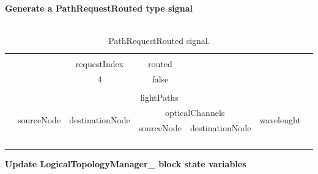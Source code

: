 \textbf{Generate a PathRequestRouted type signal}\\ \\

\begin{table}[H]
	\centering
	\begin{tabular}{|lllclll|}
		\hline
		&  &  & \multicolumn{1}{l}{} &  &  &  \\ \cline{3-4}
		& \multicolumn{1}{l|}{} & \multicolumn{1}{c|}{requestIndex} & \multicolumn{1}{c|}{routed} &  &  &  \\ \cline{3-4}
		& \multicolumn{1}{l|}{} & \multicolumn{1}{c|}{4} & \multicolumn{1}{c|}{false} &  &  &  \\ \cline{3-4}
		&  &  & \multicolumn{1}{l}{} &  &  &  \\ \cline{2-6}
		\multicolumn{1}{|l|}{} & \multicolumn{5}{c|}{lightPaths} &  \\ \cline{2-6}
		\multicolumn{1}{|l|}{} & \multicolumn{1}{l|}{\multirow{2}{*}{sourceNode}} & \multicolumn{1}{l|}{\multirow{2}{*}{destinationNode}} & \multicolumn{2}{c|}{opticalChannels} & \multicolumn{1}{l|}{\multirow{2}{*}{wavelenght}} &  \\ \cline{4-5}
		\multicolumn{1}{|l|}{} & \multicolumn{1}{l|}{} & \multicolumn{1}{l|}{} & \multicolumn{1}{l|}{sourceNode} & \multicolumn{1}{l|}{destinationNode} & \multicolumn{1}{l|}{} &  \\ \cline{2-6}
		\multicolumn{1}{|l|}{} & \multicolumn{1}{c|}{\multirow{3}{*}{}} & \multicolumn{1}{c|}{\multirow{3}{*}{}} & \multicolumn{1}{c|}{} & \multicolumn{1}{c|}{} & \multicolumn{1}{c|}{\multirow{3}{*}{}} &  \\ \cline{4-5}
		\multicolumn{1}{|l|}{} & \multicolumn{1}{c|}{} & \multicolumn{1}{c|}{} & \multicolumn{1}{c|}{} & \multicolumn{1}{c|}{} & \multicolumn{1}{c|}{} &  \\ \cline{4-5}
		\multicolumn{1}{|l|}{} & \multicolumn{1}{c|}{} & \multicolumn{1}{c|}{} & \multicolumn{1}{c|}{} & \multicolumn{1}{c|}{} & \multicolumn{1}{c|}{} &  \\ \cline{2-6}
		&  &  & \multicolumn{1}{l}{} &  &  &  \\ \hline
	\end{tabular}
	\caption{PathRequestRouted signal.}
\end{table}
\textbf{Update LogicalTopologyManager\_  block state variables}

